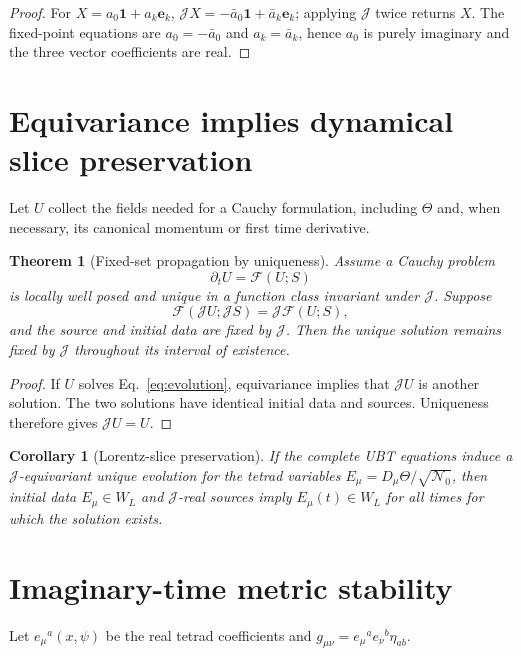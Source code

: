 \documentclass[12pt,a4paper]{article}
\newtheorem{theorem}[definition]{Theorem}
\newtheorem{corollary}[definition]{Corollary}
\theoremstyle{remark}\newtheorem{remark}[definition]{Remark}
\begin{document}
\begin{proof}
For $X=a_0\mathbf1+a_k\mathbf e_k$,
$\mathcal JX=-\bar a_0\mathbf1+\bar a_k\mathbf e_k$; applying $\mathcal J$
twice returns $X$.  The fixed-point equations are
$a_0=-\bar a_0$ and $a_k=\bar a_k$, hence $a_0$ is purely imaginary and the
three vector coefficients are real.
\end{proof}

\section{Equivariance implies dynamical slice preservation}
Let $U$ collect the fields needed for a Cauchy formulation, including $\Theta$
and, when necessary, its canonical momentum or first time derivative.

\begin{theorem}[Fixed-set propagation by uniqueness]
Assume a Cauchy problem
\begin{equation}
 \partial_t U=\mathcal F(U;S)
 \label{eq:evolution}
\end{equation}
is locally well posed and unique in a function class invariant under
$\mathcal J$.  Suppose
\begin{equation}
 \mathcal F(\mathcal JU;\mathcal JS)
 =\mathcal J\mathcal F(U;S),
 \label{eq:equivariance}
\end{equation}
and the source and initial data are fixed by $\mathcal J$.  Then the unique
solution remains fixed by $\mathcal J$ throughout its interval of existence.
\end{theorem}

\begin{proof}
If $U$ solves Eq.~\eqref{eq:evolution}, equivariance implies that
$\mathcal JU$ is another solution.  The two solutions have identical initial
data and sources.  Uniqueness therefore gives $\mathcal JU=U$.
\end{proof}

\begin{corollary}[Lorentz-slice preservation]
If the complete UBT equations induce a $\mathcal J$-equivariant unique
evolution for the tetrad variables $E_\mu=D_\mu\Theta/\sqrt{\mathcal N_0}$,
then initial data $E_\mu\in W_L$ and $\mathcal J$-real sources imply
$E_\mu(t)\in W_L$ for all times for which the solution exists.
\end{corollary}

\section{Imaginary-time metric stability}
Let $e_\mu{}^a(x,\psi)$ be the real tetrad coefficients and
$g_{\mu\nu}=e_\mu{}^ae_\nu{}^b\eta_{ab}$.
\end{document}
